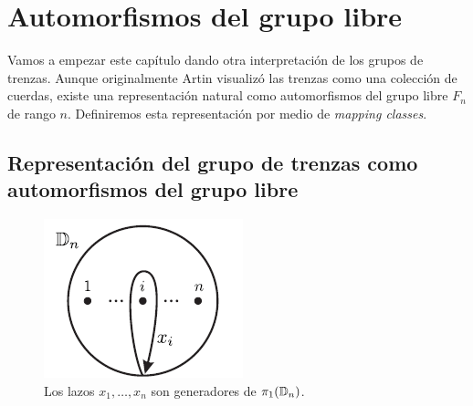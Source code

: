 \documentclass[TFG.tex]{subfiles}
\begin{document}
\chapter{Automorfismos del grupo libre}

Vamos a empezar este capítulo dando otra interpretación de los grupos de trenzas. Aunque originalmente Artin visualizó las trenzas como una colección de cuerdas, existe una representación natural como automorfismos del grupo libre $F_n$ de rango $n$. Definiremos esta representación por medio de \emph{mapping classes}.

\section{Representación del grupo de trenzas como automorfismos del grupo libre}

\begin{figure}[h!]
\includegraphics[scale=0.7]{Imagenes/Disco.png}
\caption{Los lazos $x_1,\dots,x_n$ son generadores de $\pi_1(\mathbb{D}_n)$.}\label{disco}
\end{figure}
\end{document}
